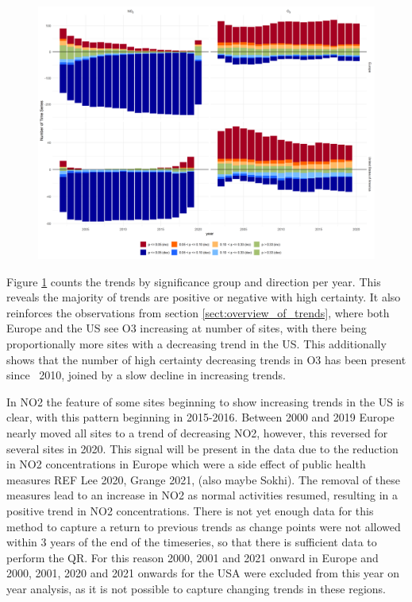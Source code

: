 \documentclass[journal abbreviation, manuscript]{copernicus}
\begin{document}
\begin{figure}[htbp]
\includegraphics[width=12cm]{plots/p_bar_year.png}
\caption{}
\label{fig:p_bar_year}
\end{figure}

Figure \ref{fig:p_bar_year} counts the trends by significance group and direction per year. This reveals the majority of trends are positive or negative with high certainty. It also reinforces the observations from section \ref{sect:overview_of_trends}, where both Europe and the US see O3 increasing at number of sites, with there being proportionally more sites with a decreasing trend in the US. This additionally shows that the number of high certainty decreasing trends in O3 has been present since ~2010, joined by a slow decline in increasing trends. 

In NO2 the feature of some sites beginning to show increasing trends in the US is clear, with this pattern beginning in 2015-2016. Between 2000 and 2019 Europe nearly moved all sites to a trend of decreasing NO2, however, this reversed for several sites in 2020. This signal will be present in the data due to the reduction in NO2 concentrations in Europe which were a side effect of public health measures REF Lee 2020, Grange 2021, (also maybe Sokhi). The removal of these measures lead to an increase in NO2 as normal activities resumed, resulting in a positive trend in NO2 concentrations. There is not yet enough data for this method to capture a return to previous trends as change points were not allowed within 3 years of the end of the timeseries, so that there is sufficient data to perform the QR. For this reason 2000, 2001 and 2021 onward in Europe and 2000, 2001, 2020 and 2021 onwards for the USA were excluded from this year on year analysis, as it is not possible to capture changing trends in these regions. 
\end{document}
